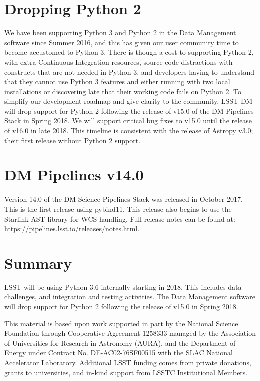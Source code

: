 \documentclass[11pt,twoside]{article}
\begin{document}
\section{Dropping Python 2}

We have been supporting Python 3 and Python 2 in the Data Management software since Summer 2016, and this has given our user community time to become accustomed to Python 3.
There is though a cost to supporting Python 2, with extra Continuous Integration resources, source code distractions with constructs that are not needed in Python 3, and developers having to understand that they cannot use Python 3 features and either running with two local installations or discovering late that their working code fails on Python 2.
To simplify our development roadmap and give clarity to the community, LSST DM will drop support for Python 2 following the release of v15.0 of the DM  Pipelines Stack in Spring 2018.
We will support critical bug fixes to v15.0 until the release of v16.0 in late 2018. This timeline is consistent with the release of Astropy v3.0; their first release without Python 2 support.

\section{DM Pipelines v14.0}

Version 14.0 of the DM Science Pipelines Stack was released in October 2017.
This is the first release using pybind11.
This release also begins to use the Starlink AST library \citep{2016A&C....15...33B} for WCS handling.
Full release notes can be found at: \url{https://pipelines.lsst.io/releases/notes.html}.

\section{Summary}

LSST will be using Python 3.6 internally starting in 2018.
This includes data challenges, and integration and testing activities.
The Data Management software will drop support for Python 2 following the release of v15.0 in Spring 2018.

\acknowledgements This material is based upon work supported in part by the National Science Foundation through Cooperative Agreement 1258333 managed by the Association of Universities for Research in Astronomy (AURA), and the Department of Energy under Contract No. DE-AC02-76SF00515 with the SLAC National Accelerator Laboratory. Additional LSST funding comes from private donations, grants to universities, and in-kind support from LSSTC Institutional Members.

\end{document}
